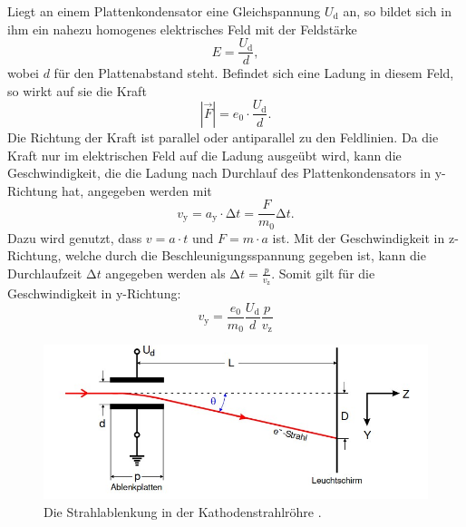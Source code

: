     Liegt an einem Plattenkondensator eine Gleichspannung $U_{\text{d}}$ an, so bildet sich in ihm ein nahezu homogenes elektrisches Feld mit der Feldstärke
    \begin{equation*}
        E = \frac{U_{\text{d}}}{d}, 
    \end{equation*}
    wobei $d$ für den Plattenabstand steht. Befindet sich eine Ladung in diesem Feld, so wirkt auf sie die Kraft
    \begin{equation*}
        |\vec{F}| = e_0 \cdot \frac{U_{\text{d}}}{d}.
    \end{equation*}
    Die Richtung der Kraft ist parallel oder antiparallel zu den Feldlinien. Da die Kraft nur im elektrischen Feld auf die Ladung ausgeübt wird, kann die Geschwindigkeit, 
    die die Ladung nach Durchlauf des Plattenkondensators in y-Richtung hat, angegeben werden mit  
    \begin{equation*}
        v_{\text{y}} = a_{\text{y}} \cdot \increment t = \frac{F}{m_0} \increment t. 
    \end{equation*}
    Dazu wird genutzt, dass $v = a \cdot t$ und $F = m \cdot a$ ist. Mit der Geschwindigkeit in z-Richtung, welche durch die Beschleunigungsspannung gegeben ist, 
    kann die Durchlaufzeit $\increment t$ angegeben werden als $\increment t = \frac{p}{v_{\text{z}}}$. Somit gilt für die Geschwindigkeit in y-Richtung:
    \begin{equation*}
        v_{\text{y}} = \frac{e_0}{m_0} \frac{U_{\text{d}}}{d} \frac{p}{v_{\text{z}}}
    \end{equation*}
    
    \begin{figure}
        \centering
        \includegraphics[width=\textwidth]{bilder/strahlablenkung_efeld.jpg}
        \caption{Die Strahlablenkung in der Kathodenstrahlröhre \cite{anleitung501}.}
        \label{fig:strahlablenkung_efeld}
    \end{figure}

